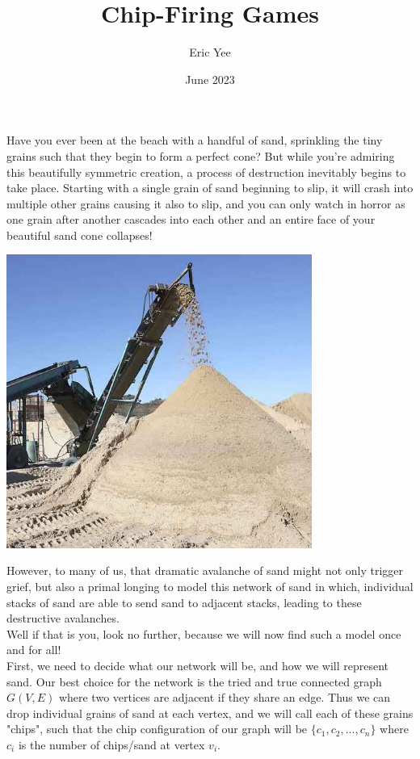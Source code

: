 \documentclass{article}
\title{Chip-Firing Games}
\author{Eric Yee}
\date{June 2023}
\begin{document}
\maketitle
Have you ever been at the beach with a handful of sand, sprinkling the tiny grains such that they begin to form a perfect cone? But while you're admiring this beautifully symmetric creation, a process of destruction inevitably begins to take place. Starting with a single grain of sand beginning to slip, it will crash into multiple other grains causing it also to slip, and you can only watch in horror as one grain after another cascades into each other and an entire face of your beautiful sand cone collapses! \\

\begin{center}
    \includegraphics[width=10cm]{images/sand.jpg}
\end{center}

However, to many of us, that dramatic avalanche of sand might not only trigger grief, but also a primal longing to model this network of sand in which, individual stacks of sand are able to send sand to adjacent stacks, leading to these destructive avalanches.\\

Well if that is you, look no further, because we will now find such a model once and for all!\\

First, we need to decide what our network will be, and how we will represent sand. Our best choice for the network is the tried and true connected graph $G(V,E)$ where two vertices are adjacent if they share an edge. Thus we can drop individual grains of sand at each vertex, and we will call each of these grains "chips", such that the chip configuration of our graph will be $\{c_1,c_2,...,c_n\}$ where $c_i$ is the number of chips/sand at vertex $v_i$.\\
\end{document}
